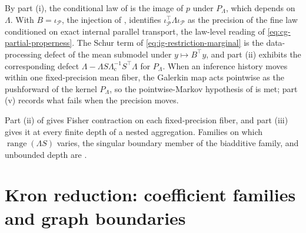 By part (i), the conditional law of  is
the image of \(p\) under \(P_\Lambda\), which depends on \(\Lambda\). With
\(B=\iota_{\mathcal P}\), the injection of ,
 identifies
\(\iota_{\mathcal P}^\top\Lambda\iota_{\mathcal P}\) as the precision of the fine
law conditioned on exact internal parallel transport, the law-level reading of
\eqref{eq:cg-partial-properness}. The Schur term of
\eqref{eq:ig-restriction-marginal} is the data-processing defect of the mean
submodel under \(y\mapsto B^\top y\), and part (ii) exhibits the corresponding
defect \(\Lambda-\Lambda S\Lambda_{\mathrm c}^{-1}S^\top\Lambda\) for
\(P_\Lambda\). When an inference history moves within one fixed-precision mean
fiber, the Galerkin map acts pointwise as the pushforward of the kernel
\(P_\Lambda\), so the pointwise-Markov hypothesis of
 is met; part (v) records what fails
when the precision moves.

Part (ii) of  gives Fisher contraction on
each fixed-precision fiber, and part (iii) gives it at every finite depth of a
nested aggregation. Families on which \(\operatorname{range}(\Lambda S)\) varies,
the singular boundary member of the biadditive family, and unbounded depth are
.

\section{Kron reduction: coefficient families and graph boundaries}
\label{sec:cg-kron}

